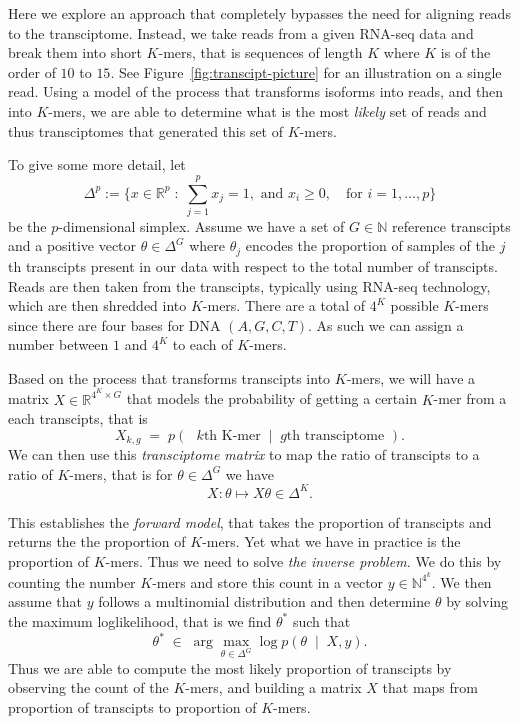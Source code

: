 \documentclass[11pt]{article}
\newcommand{\rob}[1]{\todo[inline]{\textbf{Robert: }#1}}
\begin{document}
Here we explore an approach that completely bypasses the need for aligning reads to the transciptome. Instead, we take  reads from a given RNA-seq data and break them into short $K$-mers, that is sequences of length $K$ where $K$ is of the order of $10$ to $15.$ See Figure~\ref{fig:transcipt-picture} for an illustration on a single read. 
Using a model of the process that transforms isoforms into reads, and then into $K$-mers, we are able to determine what is the most \emph{likely} set of reads and thus transciptomes that generated this set of $K$-mers.  

To give some more detail, let
 $$\Delta^p:= \{  x \in \mathbb{R}^p \; : \; \sum_{j=1}^p x_j =1, \mbox{ and }  x_i \geq 0, \quad \mbox{for } i=1,\ldots, p\}$$
 be the $p$-dimensional simplex. Assume we have a set of $G \in \mathbb{N}$ reference transcipts and a positive vector  $\theta \in \Delta^G$ where $\theta_j$  encodes the proportion of samples of the $j$th transcipts present in our data with respect to the total number of transcipts.  Reads are then taken from the transcipts, typically using RNA-seq technology, which are then shredded into $K$-mers.  There are a total of $4^K$ possible $K$-mers since there are four bases for DNA $(A, G, C, T)$. As such we can assign a number between $1$ and $4^K$ to each of  $K$-mers. 
 
Based on the process that transforms transcipts into $K$-mers, we will have a  matrix $X \in \mathbb{R}^{4^K \times G}$ that models the probability of getting a certain $K$-mer from a each transcipts, that is
\[ X_{k, g}  \; = \; p (\mbox{ $k$th K-mer} \; \mid \; \mbox{$g$th transciptome }).\]
We can then use this \emph{transciptome matrix} to map the ratio of transcipts to a ratio of $K$-mers, that is for  $\theta \in \Delta^G$ we have
\[   X :\theta \mapsto X\theta \in \Delta^K.\] 

 This establishes the \emph{forward model}, that takes the proportion of transcipts and returns the the proportion of $K$-mers. Yet what we have in practice is the proportion of $K$-mers. Thus we need to solve \emph{the inverse problem.}
 We do this by  counting the number  $K$-mers and store this count in a vector $y \in \mathbb{N}^{4^k}$.
We then assume that  $y$ follows a multinomial distribution and then determine $\theta$ by solving the maximum loglikelihood, that is we find $\theta^*$ such that
\[\theta^* \; \in \; \arg\max_{\theta \in  \Delta^G} \log p(\theta \; \mid \; X, y).\]
  Thus we are able to compute the most likely proportion of transcipts by observing the count of the $K$-mers, and building a matrix $X$ that maps from proportion of transcipts to proportion of $K$-mers.
\end{document}
